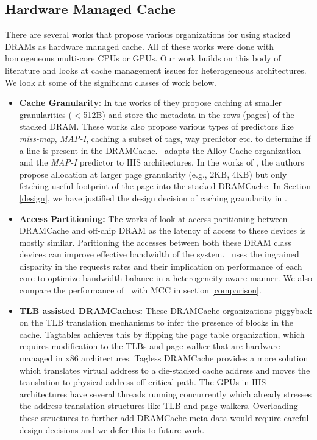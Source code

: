 \subsection{Hardware Managed Cache}
There are several works that propose various organizations for using stacked DRAMs as hardware managed cache. All of these works were done with homogeneous multi-core CPUs or GPUs. Our work builds on this body of literature and looks at cache management issues for heterogeneous architectures. We look at some of the significant classes of work below.
\begin{itemize}
\item \textbf{Cache Granularity}: In the works of \cite{loh-hill,alloy,atcache,bimodal} they propose caching at smaller granularities ($<$512B) and store the metadata in the rows (pages) of the stacked DRAM. These works also propose various types of predictors like \textit{miss-map}, \textit{MAP-I}, caching a subset of tags, way predictor etc. to determine if a line is present in the DRAMCache. \cachename\ adapts the Alloy Cache organization and the \textit{MAP-I} predictor to IHS architectures. In the works of \cite{footprint}, the authors propose allocation at larger page granularity (e.g., 2KB, 4KB) but only fetching useful footprint of the page into the stacked DRAMCache. In Section \ref{design}, we have justified the design decision of caching granularity in \cachename.

\item \textbf{Access Partitioning:} The works of \cite{mostly-clean,mainak-hpca,micro-refresh,bear} look at access paritioning between DRAMCache and off-chip DRAM as the latency of access to these devices is mostly similar. Paritioning the accesses between both these DRAM class devices can improve effective bandwidth of the system. \cachename\ uses the ingrained disparity in the requests rates and their implication on performance of each core to optimize bandwidth balance in a heterogeneity aware manner. We also compare the performance of \cachename\ with MCC \cite{mostly-clean} in section \ref{comparison}.

\item \textbf{TLB assisted DRAMCaches:} These DRAMCache organizations piggyback on the TLB translation mechanisms to infer the presence of blocks in the cache. Tagtables \cite{tag-tables} achieves this by flipping the page table organization, which requires modification to the TLBs and page walker that are hardware managed in x86 architectures. Tagless DRAMCache \cite{tagless-dramcache} provides a more solution which translates virtual address to a die-stacked cache address and moves the translation to physical address off critical path. The GPUs in IHS architectures have several threads running concurrently which already stresses the address translation structures like TLB and page walkers. Overloading these structures to further add DRAMCache meta-data would require careful design decisions and we defer this to future work.

\end{itemize}

